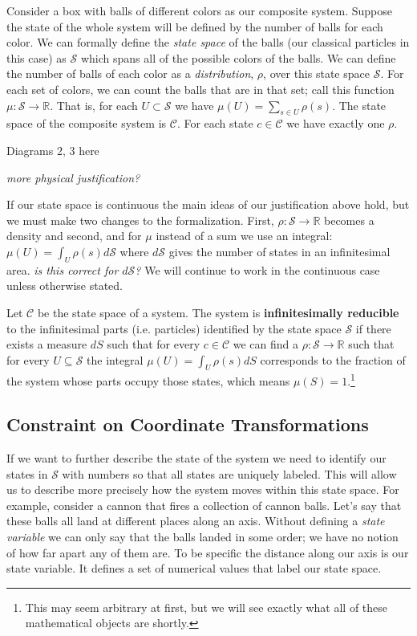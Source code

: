 \documentclass{article}
\begin{document}
	Consider a box with balls of different colors as our composite system. Suppose the state of the whole system will be defined by the number of balls for each color. We can formally define the \textit{state space} of the balls (our classical particles in this case) as $\mathcal{S}$ which spans all of the possible colors of the balls. We can define the number of balls of each color as a \textit{distribution}, $\rho$, over this state space $\mathcal{S}$. For each set of colors, we can count the balls that are in that set; call this function $\mu : \mathcal{S} \to \mathbb{R}$. That is, for each $U \subset \mathcal{S}$ we have $\mu(U) = \sum_{s \in U} \rho(s)$. The state space of the composite system is $\mathcal{C}$. For each state $c \in \mathcal{C}$ we have exactly one $\rho$.
	
Diagrams 2, 3 here
	
	\emph{more physical justification?}

	If our state space is continuous the main ideas of our justification above hold, but we must make two changes to the formalization. First, $\rho : \mathcal{S} \to \mathbb{R}$ becomes a density and second, and for $\mu$ instead of a sum we use an integral: $\mu(U) = \int_{U} \rho(s) d\mathcal{S}$ where $d\mathcal{S}$ gives the number of states in an infinitesimal area. \emph{is this correct for $d\mathcal{S}$?} We will continue to work in the continuous case unless otherwise stated.
	
\begin{defn}
	Let $\mathcal{C}$ be the state space of a system. The system is \textbf{infinitesimally reducible} to the infinitesimal parts (i.e. particles) identified by the state space $\mathcal{S}$ if there exists a measure $dS$ such that for every $c \in \mathcal{C}$ we can find a $\rho : \mathcal{S} \to \mathbb{R}$ such that for every $U \subseteq \mathcal{S}$ the integral $\mu(U) = \int_U \rho(s) dS$ corresponds to the fraction of the system whose parts occupy those states, which means $\mu(S) = 1$.\footnote{This may seem arbitrary at first, but we will see exactly what all of these mathematical objects are shortly.}
\end{defn}	
	
\subsection{Constraint on Coordinate Transformations}	

	If we want to further describe the state of the system we need to identify our states in $\mathcal{S}$ with numbers so that all states are uniquely labeled. This will allow us to describe more precisely how the system moves within this state space. For example, consider a cannon that fires a collection of cannon balls. Let's say that these balls all land at different places along an axis. Without defining a \textit{state variable} we can only say that the balls landed in some order; we have no notion of how far apart any of them are. To be specific the distance along our axis is our state variable. It defines a set of numerical values that label our state space.
\end{document}
